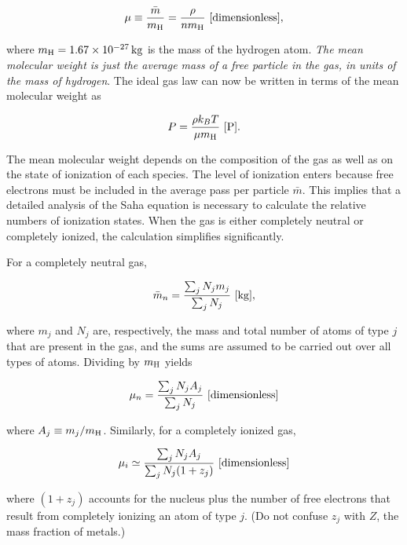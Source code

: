 \documentclass[a4paper,10pt]{article}
\begin{document}
\begin{align*}
    \mu \equiv \frac{\bar{m}}{m_{\rm H}} = \frac{\rho}{nm_{\rm H}} ~ [{\rm dimensionless}],
\end{align*}

{\noindent}where $m_{\rm H}=1.67\times10^{-27}\,{\rm kg}$ is the mass of the hydrogen atom. \textit{The mean molecular weight is just the average mass of a free particle in the gas, in units of the mass of hydrogen}. The ideal gas law can now be written in terms of the mean molecular weight as

\begin{align*}
    P = \frac{\rho k_BT}{\mu m_{\rm H}} ~ [{\rm P}].
\end{align*}

{\noindent}The mean molecular weight depends on the composition of the gas as well as on the state of ionization of each species. The level of ionization enters because free electrons must be included in the average pass per particle $\bar{m}$. This implies that a detailed analysis of the Saha equation is necessary to calculate the relative numbers of ionization states. When the gas is either completely neutral or completely ionized, the calculation simplifies significantly.

{\noindent}For a completely neutral gas,

\begin{align*}
    \bar{m}_n = \dfrac{\sum_j N_jm_j}{\sum_j N_j} ~ [{\rm kg}],
\end{align*}

{\noindent}where $m_j$ and $N_j$ are, respectively, the mass and total number of atoms of type $j$ that are present in the gas, and the sums are assumed to be carried out over all types of atoms. Dividing by $m_{\rm H}$ yields

\begin{align*}
    \mu_n = \dfrac{\sum_j N_jA_j}{\sum_j N_j} ~ [{\rm dimensionless}]
\end{align*}

{\noindent}where $A_j\equiv m_j/m_{\rm H}$. Similarly, for a completely ionized gas,

\begin{align*}
    \mu_i \simeq \dfrac{\sum_j N_jA_j}{\sum_j N_j(1+z_j)} ~ [{\rm dimensionless}]
\end{align*}

{\noindent}where $(1+z_j)$ accounts for the nucleus plus the number of free electrons that result from completely ionizing an atom of type $j$. (Do not confuse $z_j$ with $Z$, the mass fraction of metals.)
\end{document}
